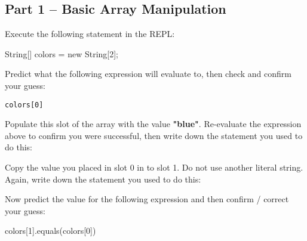 \subsection{Part 1 -- Basic Array Manipulation}

\begin{eval}
\begin{sevalenum}

\item 
Execute the following statement in the REPL:

\begin{code}
String[] colors = new String[2];
\end{code}

Predict what the following expression will evaluate to, then check and confirm your guess:

\begin{verbatim}colors[0]\end{verbatim}

\evallinetwo

\item 

Populate this slot of the array with the value \textbf{"blue"}. Re-evaluate the expression above to confirm you were successful, then write down the statement you used to do this:

\evalline

\item Copy the value you placed in slot 0 in to slot 1. Do not use another literal string. Again, write down the statement you used to do this:

\evalline

\item Now predict the value for the following expression and then confirm / correct your guess:

\begin{code}
colors[1].equals(colors[0])
\end{code}

\evallinetwo

\end{sevalenum}
\end{eval}




